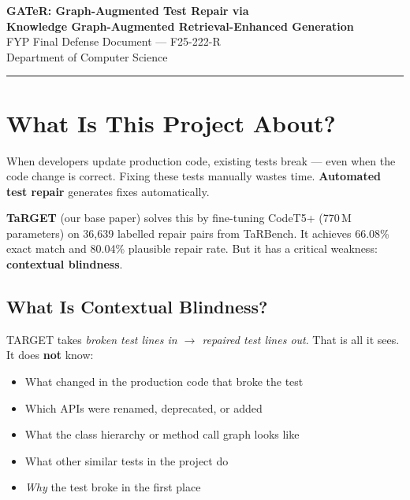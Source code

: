 \documentclass[11pt,a4paper]{article}
\begin{document}
\begin{center}
{\LARGE\bfseries GATeR: Graph-Augmented Test Repair via\\
Knowledge Graph-Augmented Retrieval-Enhanced Generation}\\[8pt]
{\large FYP Final Defense Document --- F25-222-R}\\[4pt]
{\normalsize Department of Computer Science}\\[10pt]
\rule{\textwidth}{0.4pt}
\end{center}

\section{What Is This Project About?}

When developers update production code, existing tests break --- even
when the code change is correct.  Fixing these tests manually wastes
time.  \textbf{Automated test repair} generates fixes automatically.

\textbf{TaRGET} (our base paper) solves this by fine-tuning CodeT5+
(770\,M parameters) on 36,639 labelled repair pairs from TaRBench.
It achieves 66.08\% exact match and 80.04\% plausible repair rate.
But it has a critical weakness: \textbf{contextual blindness}.

\subsection{What Is Contextual Blindness?}

TARGET takes \textit{broken test lines in $\to$ repaired test lines out}.
That is all it sees.  It does \textbf{not} know:

\begin{itemize}[nosep,leftmargin=1.5em]
  \item What changed in the production code that broke the test
  \item Which APIs were renamed, deprecated, or added
  \item What the class hierarchy or method call graph looks like
  \item What other similar tests in the project do
  \item \textit{Why} the test broke in the first place
\end{itemize}
\end{document}
